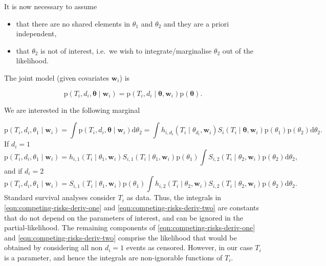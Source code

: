 \documentclass[
  10pt,
  a4paper,
]{article}
\providecommand{\tightlist}{%
  \setlength{\itemsep}{0pt}\setlength{\parskip}{0pt}}
\newcommand{\pd}{\text{p}}
\begin{document}
It is now necessary to assume

\begin{itemize}
\tightlist
\item
  that there are no shared elements in \(\theta_{1}\) and \(\theta_{2}\)
  and they are a priori independent,
\item
  that \(\theta_{2}\) is not of interest, i.e.~we wish to
  integrate/marginalise \(\theta_{2}\) out of the likelihood.
\end{itemize}

The joint model (given covariates \(\boldsymbol{w}_{i}\)) is

\begin{equation}
  \pd(T_{i}, d_{i}, \boldsymbol{\theta} \mid \boldsymbol{w}_{i}) =
    \pd(T_{i}, d_{i} \mid \boldsymbol{\theta}, \boldsymbol{w}_{i})\pd(\boldsymbol{\theta}).
\end{equation}

We are interested in the following marginal

\begin{equation}
  \pd(T_{i}, d_{i}, \theta_{1} \mid \boldsymbol{w}_{i})
  = \int \pd(T_{i}, d_{i}, \boldsymbol{\theta} \mid \boldsymbol{w}_{i}) \text{d}\theta_{2}
  = \int h_{i, d_{i}}(T_{i} \mid \theta_{d_{i}}, \boldsymbol{w}_{i}) S_{i}(T_{i} \mid \boldsymbol{\theta}, \boldsymbol{w}_{i}) \pd(\theta_{1}) \pd(\theta_{2}) \text{d}\theta_{2}.
\end{equation} If \(d_{i} = 1\) \begin{equation}
  \pd(T_{i}, d_{i}, \theta_{1} \mid \boldsymbol{w}_{i})
  = h_{i, 1}(T_{i} \mid \theta_{1}, \boldsymbol{w}_{i}) S_{i, 1}(T_{i} \mid \theta_{1}, \boldsymbol{w}_{i}) \pd(\theta_{1}) \int S_{i, 2}(T_{i} \mid \theta_{2}, \boldsymbol{w}_{i}) \pd(\theta_{2}) \text{d} \theta_{2},
  \label{eqn:competing-risks-deriv-one}
\end{equation} and if \(d_{i} = 2\) \begin{equation}
  \pd(T_{i}, d_{i}, \theta_{1} \mid \boldsymbol{w}_{i})
  = S_{i, 1}(T_{i} \mid \theta_{1}, \boldsymbol{w}_{i}) \pd(\theta_{1}) \int h_{i, 2}(T_{i} \mid \theta_{2}, \boldsymbol{w}_{i}) S_{i, 2}(T_{i} \mid \theta_{2}, \boldsymbol{w}_{i}) \pd(\theta_{2}) \text{d} \theta_{2}.
  \label{eqn:competing-risks-deriv-two}
\end{equation} Standard survival analyses consider \(T_{i}\) as data.
Thus, the integrals in \eqref{eqn:competing-risks-deriv-one} and
\eqref{eqn:competing-risks-deriv-two} are constants that do not depend
on the parameters of interest, and can be ignored in the
partial-likelihood. The remaining components of
\eqref{eqn:competing-risks-deriv-one} and
\eqref{eqn:competing-risks-deriv-two} comprise the likelihood that would
be obtained by considering all non \(d_{i} = 1\) events as censored.
However, in our case \(T_{i}\) is a parameter, and hence the integrals
are non-ignorable functions of \(T_{i}\).
\end{document}
